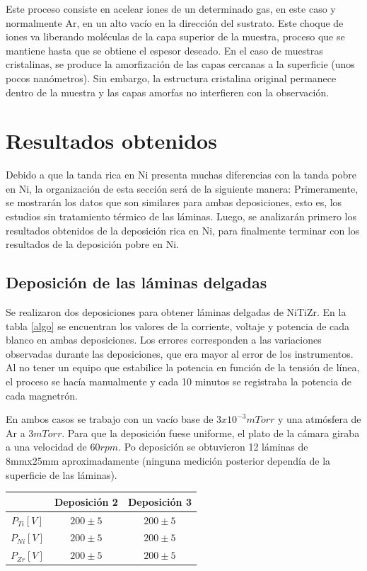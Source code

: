 \documentclass[12pt]{article}
\theoremstyle{definition}
\theoremstyle{remark}
\begin{document}
Este proceso consiste en acelear iones de un determinado gas, en este caso y normalmente Ar, en un alto vacío en la dirección del sustrato. Este choque de iones va liberando moléculas de la capa superior de la muestra, proceso que se mantiene hasta que se obtiene el espesor deseado. En el caso de muestras cristalinas, se produce la amorfización de las capas cercanas a la superficie (unos pocos nanómetros). Sin embargo, la estructura cristalina original permanece dentro de la muestra y las capas amorfas no interfieren con la observación.


\section{Resultados obtenidos}
Debido a que la tanda rica en Ni presenta muchas diferencias con la tanda pobre en Ni, la organización de esta sección será de la siguiente manera: Primeramente, se mostrarán los datos que son similares para ambas deposiciones, esto es, los estudios sin tratamiento térmico de las láminas. Luego, se analizarán primero los resultados obtenidos de la deposición rica en Ni, para finalmente terminar con los resultados de la deposición pobre en Ni.
\subsection{Deposición de las láminas delgadas}
Se realizaron dos deposiciones para obtener láminas delgadas de NiTiZr. En la tabla \ref{algo} se encuentran los valores de la corriente, voltaje y potencia de cada blanco en ambas deposiciones. Los errores corresponden a las variaciones observadas durante las deposiciones, que era mayor al error de los instrumentos. Al no tener un equipo que estabilice la potencia en función de la tensión de línea, el proceso se hacía manualmente y cada 10 minutos se registraba la potencia de cada magnetrón.

En ambos casos se trabajo con un vacío base de $3 x 10^{-3}mTorr$ y una atmósfera de Ar a $3 mTorr$. Para que la deposición fuese uniforme, el plato de la cámara giraba a una velocidad de $60 rpm$. Po deposición se obtuvieron 12 láminas de 8mmx25mm aproximadamente (ninguna medición posterior dependía de la superficie de las láminas).

\begin{table}[H]
\centering
\begin{tabular}{|c|c|c|}
\hline
 & Deposición 2 & Deposición 3 \\ \hline
$P_{Ti}[V]$ & $200 \pm 5$ & $200 \pm 5$ \\ \hline
$P_{Ni}[V]$ & $200 \pm 5$ & $200 \pm 5$ \\ \hline
$P_{Zr}[V]$ & $200 \pm 5$ & $200 \pm 5$ \\ \hline
\end{tabular}
\end{table}
\end{document}
